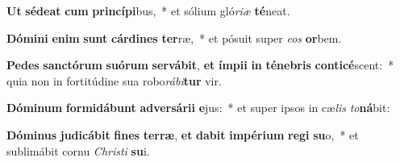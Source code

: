 \item \textbf{Ut} \textbf{sé}\textbf{de}\textbf{at} \textbf{cum} \textbf{prin}\textbf{cí}\textbf{pi}bus,~* et sólium gló\textit{ri}\textit{æ} \textbf{té}neat.
\item \textbf{Dó}\textbf{mi}\textbf{ni} \textbf{e}\textbf{nim} \textbf{sunt} \textbf{cár}\textbf{di}\textbf{nes} \textbf{ter}ræ,~* et pósuit super \textit{e}\textit{os} \textbf{or}bem.
\item \textbf{Pe}\textbf{des} \textbf{sanc}\textbf{tó}\textbf{rum} \textbf{su}\textbf{ó}\textbf{rum} \textbf{ser}\textbf{vá}\textbf{bit}, \textbf{et} \textbf{ím}\textbf{pi}\textbf{i} \textbf{in} \textbf{té}\textbf{ne}\textbf{bris} \textbf{con}\textbf{ti}\textbf{cé}scent:~* quia non in fortitúdine sua robo\textit{rá}\textit{bi}\textbf{tur} vir.
\item \textbf{Dó}\textbf{mi}\textbf{num} \textbf{for}\textbf{mi}\textbf{dá}\textbf{bunt} \textbf{ad}\textbf{ver}\textbf{sá}\textbf{ri}\textbf{i} \textbf{e}jus:~* et super ipsos in cæ\textit{lis} \textit{to}\textbf{ná}bit:
\item \textbf{Dó}\textbf{mi}\textbf{nus} \textbf{ju}\textbf{di}\textbf{cá}\textbf{bit} \textbf{fi}\textbf{nes} \textbf{ter}\textbf{ræ}, \textbf{et} \textbf{da}\textbf{bit} \textbf{im}\textbf{pé}\textbf{ri}\textbf{um} \textbf{re}\textbf{gi} \textbf{su}o,~* et sublimábit cornu \textit{Chris}\textit{ti} \textbf{su}i.
